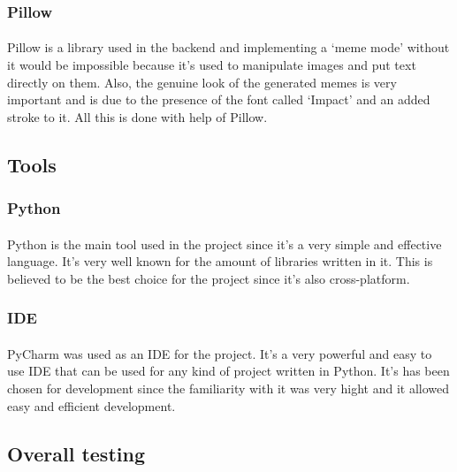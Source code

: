 \documentclass[12pt]{report}
\begin{document}
\subsubsection*{Pillow}
\paragraph{}
Pillow is a library used in the backend and implementing a `meme mode' without it would be impossible because it's used
to manipulate images and put text directly on them. Also, the genuine look of the generated memes is very important and is due
to the presence of the font called `Impact' and an added stroke to it. All this is done with help of Pillow.

\subsection*{Tools}
\subsubsection*{Python}
\paragraph{}
Python is the main tool used in the project since it's a very simple and effective language. It's very well known for
the amount of libraries written in it. This is believed to be the best choice for the project since it's also cross-platform.

\subsubsection*{IDE}
\paragraph{}
PyCharm was used as an IDE for the project. It's a very powerful and easy to use IDE that can be used for any kind of project
written in Python. It's has been chosen for development since the familiarity with it was very hight and it allowed
easy and efficient development.

\subsection*{Overall testing}
\end{document}
